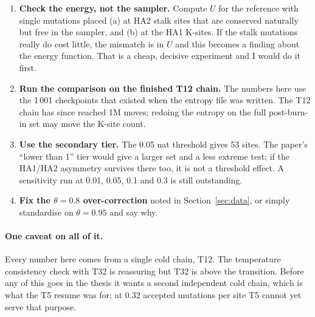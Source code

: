 \documentclass[11pt,a4paper]{article}
\begin{document}
\begin{enumerate}
  \item \textbf{Check the energy, not the sampler.} Compute $U$ for the
    reference with single mutations placed (a) at HA2 stalk sites that are
    conserved naturally but free in the sampler, and (b) at the HA1 K-sites.
    If the stalk mutations really do cost little, the mismatch is in $U$ and
    this becomes a finding about the energy function. That is a cheap, decisive
    experiment and I would do it first.
  \item \textbf{Run the comparison on the finished T12 chain.} The numbers here
    use the 1\,001 checkpoints that existed when the entropy file was written.
    The T12 chain has since reached 1M moves; redoing the entropy on the full
    post-burn-in set may move the K-site count.
  \item \textbf{Use the secondary tier.} The 0.05 nat threshold gives 53 sites.
    The paper's ``lower than 1'' tier would give a larger set and a less extreme
    test; if the HA1/HA2 asymmetry survives there too, it is not a threshold
    effect. A sensitivity run at 0.01, 0.05, 0.1 and 0.3 is still outstanding.
  \item \textbf{Fix the $\theta = 0.8$ over-correction} noted in
    Section~\ref{sec:data}, or simply standardise on $\theta = 0.95$ and say
    why.
\end{enumerate}

\paragraph{One caveat on all of it.}
Every number here comes from a single cold chain, T12. The temperature
consistency check with T32 is reassuring but T32 is above the transition. Before
any of this goes in the thesis it wants a second independent cold chain, which
is what the T5 resume was for; at 0.32 accepted mutations per site T5 cannot yet
serve that purpose.
\end{document}
